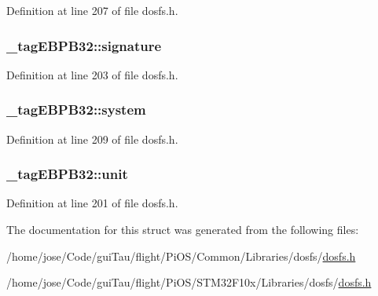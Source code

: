Definition at line 207 of file dosfs.\-h.

\hypertarget{struct__tag_e_b_p_b32_aa962ff6434d08582a956fbe60a4e47cc}{
\subsubsection[{signature}]{ \-\_\-tag\-E\-B\-P\-B32\-::signature}}\label{struct__tag_e_b_p_b32_aa962ff6434d08582a956fbe60a4e47cc}


Definition at line 203 of file dosfs.\-h.

\hypertarget{struct__tag_e_b_p_b32_aea64103d771d43a4ae2590ebe065ff72}{
\subsubsection[{system}]{ \-\_\-tag\-E\-B\-P\-B32\-::system}}\label{struct__tag_e_b_p_b32_aea64103d771d43a4ae2590ebe065ff72}


Definition at line 209 of file dosfs.\-h.

\hypertarget{struct__tag_e_b_p_b32_ad6539bb48f3cabc55a00dbe92048ff5a}{
\subsubsection[{unit}]{ \-\_\-tag\-E\-B\-P\-B32\-::unit}}\label{struct__tag_e_b_p_b32_ad6539bb48f3cabc55a00dbe92048ff5a}


Definition at line 201 of file dosfs.\-h.



The documentation for this struct was generated from the following files\-:\begin{DoxyCompactItemize}
\item 
/home/jose/\-Code/gui\-Tau/flight/\-Pi\-O\-S/\-Common/\-Libraries/dosfs/\hyperlink{_common_2_libraries_2dosfs_2dosfs_8h}{dosfs.\-h}\item 
/home/jose/\-Code/gui\-Tau/flight/\-Pi\-O\-S/\-S\-T\-M32\-F10x/\-Libraries/dosfs/\hyperlink{_s_t_m32_f10x_2_libraries_2dosfs_2dosfs_8h}{dosfs.\-h}\end{DoxyCompactItemize}
